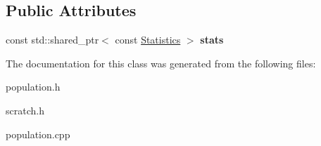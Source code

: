 \subsection*{Public Attributes}
\begin{DoxyCompactItemize}
\item 
\mbox{\label{class_population_a77654769dc98036408b381f6d63d5aa4}} 
const std\+::shared\+\_\+ptr$<$ const \hyperlink{class_population_1_1_statistics}{Statistics} $>$ {\bfseries stats}
\end{DoxyCompactItemize}


The documentation for this class was generated from the following files\+:\begin{DoxyCompactItemize}
\item 
population.\+h\item 
scratch.\+h\item 
population.\+cpp\end{DoxyCompactItemize}
